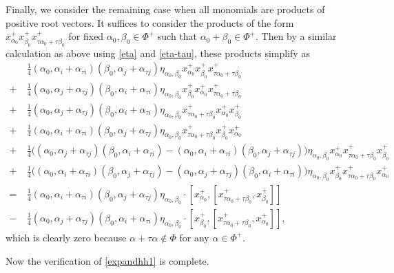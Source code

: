 \documentclass[11pt,reqno]{amsart}
\numberwithin{equation}{section}
\theoremstyle{definition}
\theoremstyle{remark}
\begin{document}
Finally, we consider the remaining case when all monomials are products of positive root vectors. It suffices to consider the products of the form $x_{\alpha_0}^+x_{\beta_0}^+x_{\tau\alpha_0+\tau\beta_0}^+$ for fixed $\alpha_0,\beta_0\in \Phi^+$ such that $\alpha_0+\beta_0\in\Phi^+$. Then by a similar calculation as above using \eqref{eta} and \eqref{eta-tau}, these products simplify as 
\begin{align*}
&\tfrac{1}{4}(\alpha_0,\alpha_i+\alpha_{\tau i})
(\beta_0,\alpha_j+\alpha_{\tau j})
\eta_{\alpha_0,\beta_0}
x_{\alpha_0}^{+}x_{\beta_0}^{+}x_{\tau\alpha_0+\tau\beta_0}^{+}
\\
+~&\tfrac{1}{4}
(\alpha_0,\alpha_j+\alpha_{\tau j})
(\beta_0,\alpha_i+\alpha_{\tau i})
\eta_{\alpha_0,\beta_0}
x_{\beta_0}^{+}x_{\alpha_0}^{+}x_{\tau\alpha_0+\tau\beta_0}^{+}
\\
+~&\tfrac{1}{4}
(\alpha_0,\alpha_j+\alpha_{\tau j})
(\beta_0,\alpha_i+\alpha_{\tau i})
\eta_{\alpha_0,\beta_0}
x_{\tau\alpha_0+\tau\beta_0}^{+}x_{\alpha_0}^{+}x_{\beta_0}^{+}
\\
+~&\tfrac{1}{4}
(\alpha_0,\alpha_i+\alpha_{\tau i})
(\beta_0,\alpha_j+\alpha_{\tau j})
\eta_{\alpha_0,\beta_0}
x_{\tau\alpha_0+\tau\beta_0}^{+}x_{\beta_0}^{+}x_{\alpha_0}^{+}
\\
+~&\tfrac{1}{4}
\Big(
(\alpha_0,\alpha_j+\alpha_{\tau j})
(\beta_0,\alpha_i+\alpha_{\tau i})
-
(\alpha_0,\alpha_i+\alpha_{\tau i})
(\beta_0,\alpha_j+\alpha_{\tau j})
\Big)
\eta_{\alpha_0,\beta_0}
x_{\alpha_0}^{+}
x_{\tau\alpha_0+\tau\beta_0}^{+}
x_{\beta_0}^{+}
\\
+~&\tfrac{1}{4}
\Big(
(\alpha_0,\alpha_i+\alpha_{\tau i})
(\beta_0,\alpha_j+\alpha_{\tau j})
-
(\alpha_0,\alpha_j+\alpha_{\tau j})
(\beta_0,\alpha_i+\alpha_{\tau i})
\Big)
\eta_{\alpha_0,\beta_0}
x_{\beta_0}^{+}
x_{\tau\alpha_0+\tau\beta_0}^{+}
x_{\alpha_0}^{+}
\\
=~&\tfrac{1}{4}
(\alpha_0,\alpha_i+\alpha_{\tau i})
(\beta_0,\alpha_j+\alpha_{\tau j})
\eta_{\alpha_0,\beta_0}
\cdot
[x_{\alpha_0}^{+},
[x_{\tau\alpha_0+\tau\beta_0}^{+},x_{\beta_0}^{+}]]
\\ 
-~&\tfrac{1}{4}
(\alpha_0,\alpha_j+\alpha_{\tau j})
(\beta_0,\alpha_i+\alpha_{\tau i})
\eta_{\alpha_0,\beta_0}
\cdot
[x_{\beta_0}^{+},
[x_{\tau\alpha_0+\tau\beta_0}^{+},x_{\alpha_0}^{+}]],
\end{align*}
which is clearly zero because $\alpha+\tau\alpha\notin\Phi$ for any $\alpha\in\Phi^+$.

Now the verification of \eqref{expandhh1} is complete.
\end{document}
